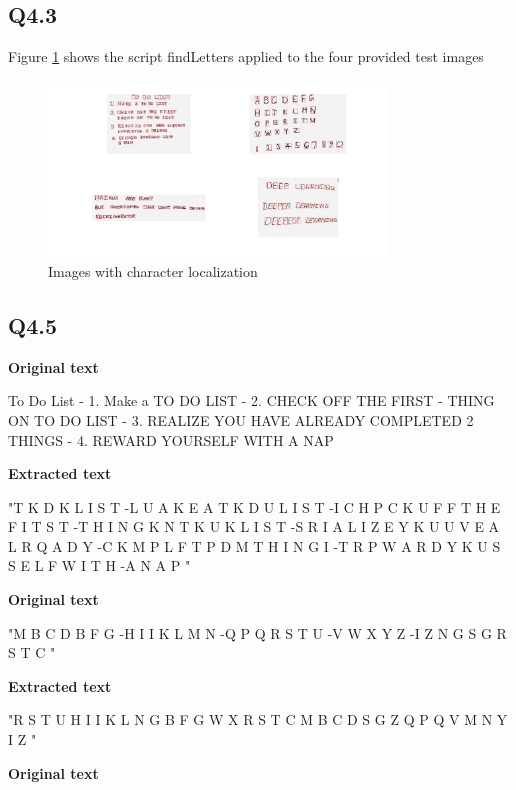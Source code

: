 \documentclass[12pt]{article}
\begin{document}
\subsection{Q4.3}
Figure \ref{fig:charboxes} shows the script findLetters applied to the four provided test images

\begin{figure}[H]
\centering
\includegraphics[page=1,width=0.8\textwidth]{char_boxes}
\caption{Images with character localization} 
\label{fig:charboxes}
\end{figure}   


\subsection{Q4.5}
\textbf { Original text }
 
To Do List  - 1. Make a TO DO LIST  - 2. CHECK OFF THE FIRST - THING ON TO DO LIST - 3. REALIZE YOU HAVE ALREADY COMPLETED 2 THINGS - 4. REWARD YOURSELF WITH A NAP

\bigskip

\textbf { Extracted text }

"T K D K L I S T -L U A K E A T K D U L I S T -I C H P C K U F F T H E F I T S T -T H I N G K N T K U K L I S T -S R I A L I Z E Y K U U V E A L R Q A D Y -C K M P L F T P D M T H I N G I -T R P W A R D Y K U S S E L F W I T H -A N A P "


\bigskip

\textbf { Original text }

"M B C D B F G -H I I K L M N -Q P Q R S T U -V W X Y Z -I Z N G S G R S T C "

\bigskip

\textbf { Extracted text }

"R S T U  H I I K L  N G  B F G  W X  R S T C  M B C D  S G  Z  Q  P Q  V  M N  Y  I Z  "

\bigskip

\textbf { Original text }
\end{document}

